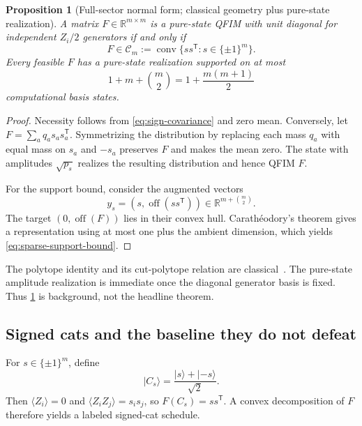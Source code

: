 \documentclass[11pt]{article}
\newtheorem{proposition}[proposition]{Proposition}
\theoremstyle{definition}
\theoremstyle{remark}
\newcommand{\R}{\mathbb{R}}
\newcommand{\conv}{\operatorname{conv}}
\newcommand{\off}{\operatorname{off}}
\newcommand{\ket}[1]{\lvert #1\rangle}
\begin{document}
\begin{proposition}[Full-sector normal form; classical geometry plus pure-state realization]
\label{prop:full-sector}
A matrix $F\in\R^{m\times m}$ is a pure-state QFIM with unit diagonal for independent $Z_i/2$ generators if and only if
\begin{equation}
  F\in\mathcal C_m
  :=\conv\{ss^{\mathsf T}:s\in\{\pm1\}^m\}.
  \label{eq:correlation-polytope}
\end{equation}
Every feasible $F$ has a pure-state realization supported on at most
\begin{equation}
  1+m+\binom m2=1+\frac{m(m+1)}2
  \label{eq:sparse-support-bound}
\end{equation}
computational basis states.
\end{proposition}

\begin{proof}
Necessity follows from \cref{eq:sign-covariance} and zero mean. Conversely, let $F=\sum_aq_as_as_a^{\mathsf T}$. Symmetrizing the distribution by replacing each mass $q_a$ with equal mass on $s_a$ and $-s_a$ preserves $F$ and makes the mean zero. The state with amplitudes $\sqrt{p_s}$ realizes the resulting distribution and hence QFIM $F$.

For the support bound, consider the augmented vectors
\begin{equation}
  y_s=(s,\off(ss^{\mathsf T}))\in\R^{m+\binom m2}.
\end{equation}
The target $(0,\off(F))$ lies in their convex hull. Carath\'eodory's theorem gives a representation using at most one plus the ambient dimension, which yields \cref{eq:sparse-support-bound}.
\end{proof}

The polytope identity and its cut-polytope relation are classical~\cite{HuberMaric2017,DezaLaurent1997,Pitowsky1991}. The pure-state amplitude realization is immediate once the diagonal generator basis is fixed. Thus \cref{prop:full-sector} is background, not the headline theorem.

\subsection{Signed cats and the baseline they do not defeat}
For $s\in\{\pm1\}^m$, define
\begin{equation}
  \ket{C_s}=\frac{\ket{s}+\ket{-s}}{\sqrt2}.
  \label{eq:signed-cat}
\end{equation}
Then $\langle Z_i\rangle=0$ and $\langle Z_iZ_j\rangle=s_is_j$, so $F(C_s)=ss^{\mathsf T}$. A convex decomposition of $F$ therefore yields a labeled signed-cat schedule.
\end{document}
